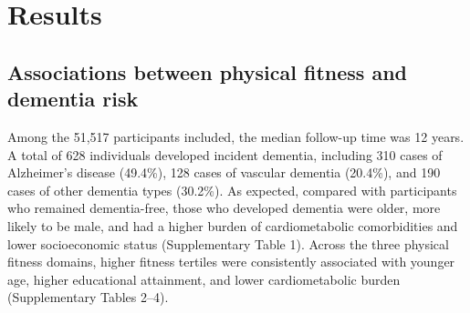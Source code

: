 \documentclass{article}
\begin{document}

\section*{Results}

\subsection*{Associations between physical fitness and dementia risk}

Among the 51,517 participants included, the median follow-up time was 12 years.
A total of 628 individuals developed incident dementia, including 310 cases of 
Alzheimer's disease (49.4\%), 128 cases of vascular dementia (20.4\%), and 190 
cases of other dementia types (30.2\%).
As expected, compared with participants who remained dementia-free, those who 
developed dementia were older, more likely to be male, and had a higher burden 
of cardiometabolic comorbidities and lower socioeconomic status (Supplementary 
Table 1).
Across the three physical fitness domains, higher fitness tertiles were 
consistently associated with younger age, higher educational attainment, and 
lower cardiometabolic burden (Supplementary Tables 2--4).
\end{document}
